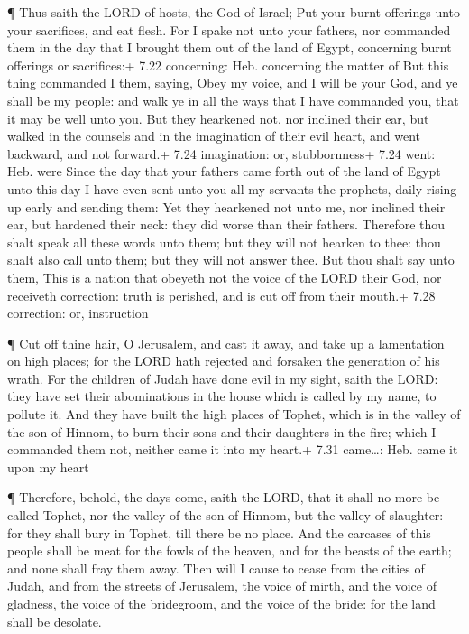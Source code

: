  ¶ Thus saith the LORD of hosts, the God of Israel; Put
your burnt offerings unto your sacrifices, and eat flesh. 
For I spake not unto your fathers, nor commanded them in the day that I
brought them out of the land of Egypt, concerning burnt offerings or
sacrifices:+ 7.22 concerning: Heb. concerning the matter of
 But this thing commanded I them, saying, Obey my voice,
and I will be your God, and ye shall be my people: and walk ye in all
the ways that I have commanded you, that it may be well unto you.
 But they hearkened not, nor inclined their ear, but walked
in the counsels and in the imagination of their evil heart, and went
backward, and not forward.+ 7.24 imagination: or, stubbornness+ 7.24
went: Heb. were  Since the day that your fathers came forth
out of the land of Egypt unto this day I have even sent unto you all my
servants the prophets, daily rising up early and sending them:
 Yet they hearkened not unto me, nor inclined their ear,
but hardened their neck: they did worse than their fathers.
 Therefore thou shalt speak all these words unto them; but
they will not hearken to thee: thou shalt also call unto them; but they
will not answer thee.  But thou shalt say unto them, This
is a nation that obeyeth not the voice of the LORD their God, nor
receiveth correction: truth is perished, and is cut off from their
mouth.+ 7.28 correction: or, instruction

 ¶ Cut off thine hair, O Jerusalem, and cast it away, and
take up a lamentation on high places; for the LORD hath rejected and
forsaken the generation of his wrath.  For the children of
Judah have done evil in my sight, saith the LORD: they have set their
abominations in the house which is called by my name, to pollute it.
 And they have built the high places of Tophet, which is in
the valley of the son of Hinnom, to burn their sons and their daughters
in the fire; which I commanded them not, neither came it into my heart.+
7.31 came\ldots: Heb. came it upon my heart

 ¶ Therefore, behold, the days come, saith the LORD, that
it shall no more be called Tophet, nor the valley of the son of Hinnom,
but the valley of slaughter: for they shall bury in Tophet, till there
be no place.  And the carcases of this people shall be meat
for the fowls of the heaven, and for the beasts of the earth; and none
shall fray them away.  Then will I cause to cease from the
cities of Judah, and from the streets of Jerusalem, the voice of mirth,
and the voice of gladness, the voice of the bridegroom, and the voice of
the bride: for the land shall be desolate.

